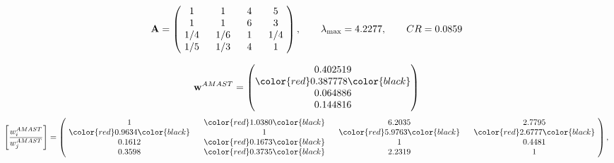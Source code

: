 \begin{example}
\begin{equation*}
\mathbf{A} =
\begin{pmatrix}
$\,\,$ 1 $\,\,$ & $\,\,$1$\,\,$ & $\,\,$4$\,\,$ & $\,\,$5 $\,\,$ \\
$\,\,$ 1 $\,\,$ & $\,\,$ 1 $\,\,$ & $\,\,$6$\,\,$ & $\,\,$3 $\,\,$ \\
$\,\,$ 1/4$\,\,$ & $\,\,$ 1/6$\,\,$ & $\,\,$ 1 $\,\,$ & $\,\,$ 1/4 $\,\,$ \\
$\,\,$ 1/5$\,\,$ & $\,\,$ 1/3$\,\,$ & $\,\,$4$\,\,$ & $\,\,$ 1  $\,\,$ \\
\end{pmatrix},
\qquad
\lambda_{\max} =
4.2277,
\qquad
CR = 0.0859
\end{equation*}

\begin{equation*}
\mathbf{w}^{AMAST} =
\begin{pmatrix}
0.402519\\
\color{red} 0.387778\color{black} \\
0.064886\\
0.144816
\end{pmatrix}\end{equation*}
\begin{equation*}
\left[ \frac{{w}^{AMAST}_i}{{w}^{AMAST}_j} \right] =
\begin{pmatrix}
$\,\,$ 1 $\,\,$ & $\,\,$\color{red} 1.0380\color{black} $\,\,$ & $\,\,$6.2035$\,\,$ & $\,\,$2.7795$\,\,$ \\
$\,\,$\color{red} 0.9634\color{black} $\,\,$ & $\,\,$ 1 $\,\,$ & $\,\,$\color{red} 5.9763\color{black} $\,\,$ & $\,\,$\color{red} 2.6777\color{black}   $\,\,$ \\
$\,\,$0.1612$\,\,$ & $\,\,$\color{red} 0.1673\color{black} $\,\,$ & $\,\,$ 1 $\,\,$ & $\,\,$0.4481 $\,\,$ \\
$\,\,$0.3598$\,\,$ & $\,\,$\color{red} 0.3735\color{black} $\,\,$ & $\,\,$2.2319$\,\,$ & $\,\,$ 1  $\,\,$ \\
\end{pmatrix},
\end{equation*}


\end{example}
